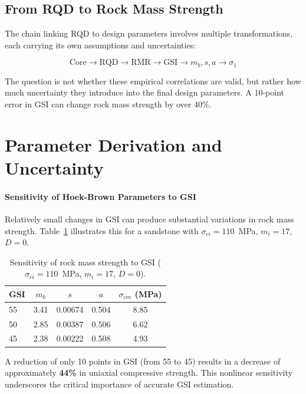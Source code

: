 \subsection{From RQD to Rock Mass Strength}
The chain linking RQD to design parameters involves multiple transformations, each carrying its own assumptions and uncertainties:

\[
\text{Core} \rightarrow \text{RQD} \rightarrow \text{RMR} \rightarrow \text{GSI} \rightarrow m_b, s, a \rightarrow \sigma_1
\]

\begin{warnbox}
The question is not whether these empirical correlations are valid, but rather how much uncertainty they introduce into the final design parameters. A 10-point error in GSI can change rock mass strength by over 40\%.
\end{warnbox}

\section{Parameter Derivation and Uncertainty}

\paragraph{Sensitivity of Hoek-Brown Parameters to GSI}
Relatively small changes in GSI can produce substantial variations in rock mass strength. Table~\ref{tab:sensitivity} illustrates this for a sandstone with $\sigma_{ci}=110$~MPa, $m_i=17$, $D=0$.

\begin{table}[h!]
\centering
\small
\begin{tabular}{lcccc}
\toprule
\textbf{GSI} & \textbf{\(m_b\)} & \textbf{\(s\)} & \textbf{\(a\)} & \textbf{\(\sigma_{cm}\) (MPa)} \\
\midrule
55 & 3.41 & 0.00674 & 0.504 & 8.85 \\
50 & 2.85 & 0.00387 & 0.506 & 6.62 \\
45 & 2.38 & 0.00222 & 0.508 & 4.93 \\
\bottomrule
\end{tabular}
\caption{Sensitivity of rock mass strength to GSI ($\sigma_{ci}=110$~MPa, $m_i=17$, $D=0$).}
\label{tab:sensitivity}
\end{table}

A reduction of only 10 points in GSI (from 55 to 45) results in a decrease of approximately \textbf{44\%} in uniaxial compressive strength. This nonlinear sensitivity underscores the critical importance of accurate GSI estimation.

